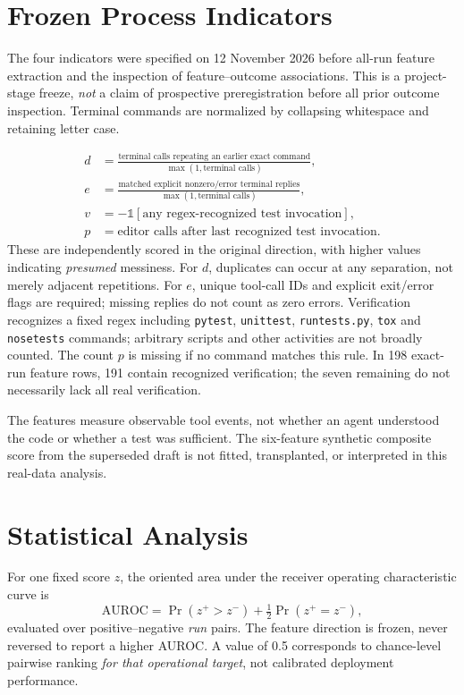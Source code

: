 \documentclass[journal]{IEEEtran}
\begin{document}


\section{Frozen Process Indicators}
The four indicators were specified on 12 November 2026 before all-run feature extraction and the inspection of feature--outcome associations. This is a project-stage freeze, \emph{not} a claim of prospective preregistration before all prior outcome inspection. Terminal commands are normalized by collapsing whitespace and retaining letter case.

\begin{align}
d &= \frac{\text{terminal calls repeating an earlier exact command}}
              {\max(1,\text{terminal calls})},\\
e &= \frac{\text{matched explicit nonzero/error terminal replies}}
              {\max(1,\text{terminal calls})},\\
v &= -\mathbb{1}[\text{any regex-recognized test invocation}],\\
p &= \text{editor calls after last recognized test invocation}.
\end{align}
These are independently scored in the original direction, with higher values indicating \emph{presumed} messiness. For $d$, duplicates can occur at any separation, not merely adjacent repetitions. For $e$, unique tool-call IDs and explicit exit/error flags are required; missing replies do not count as zero errors. Verification recognizes a fixed regex including \texttt{pytest}, \texttt{unittest}, \texttt{runtests.py}, \texttt{tox} and \texttt{nosetests} commands; arbitrary scripts and other activities are not broadly counted. The count $p$ is missing if no command matches this rule. In 198 exact-run feature rows, 191 contain recognized verification; the seven remaining do not necessarily lack all real verification.

The features measure observable tool events, not whether an agent understood the code or whether a test was sufficient. The six-feature synthetic composite score from the superseded draft is not fitted, transplanted, or interpreted in this real-data analysis.

\section{Statistical Analysis}
For one fixed score $z$, the oriented area under the receiver operating characteristic curve is
\begin{equation}
\mathrm{AUROC}=\Pr(z^+>z^-)+\tfrac12\Pr(z^+=z^-),
\end{equation}
evaluated over positive--negative \emph{run} pairs. The feature direction is frozen, never reversed to report a higher AUROC. A value of 0.5 corresponds to chance-level pairwise ranking \emph{for that operational target}, not calibrated deployment performance.
\end{document}
